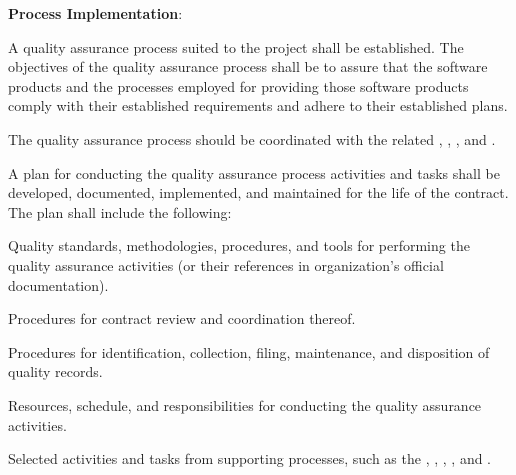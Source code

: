 			\begin{adjustwidth}{2em}{0pt} 

				\begin{compactenum}

					\item {\bf Process Implementation}:

					\begin{compactenum}

						\item A quality assurance process suited to the project shall be established. The objectives of the quality assurance process shall be to assure that the software products and the processes employed for providing those software products comply with their established requirements and adhere to their established plans.

						\item The quality assurance process should be coordinated with the related , , , and .

						\item A plan for conducting the quality assurance process activities and tasks shall be developed, documented, implemented, and maintained for the life of the contract. The plan shall include the following:

						\begin{compactenum}

							\item Quality standards, methodologies, procedures, and tools for performing the quality assurance activities (or their references in organization's official documentation).

							\item Procedures for contract review and coordination thereof.

							\item Procedures for identification, collection, filing, maintenance, and disposition of quality records.

							\item Resources, schedule, and responsibilities for conducting the quality assurance activities.

							\item Selected activities and tasks from supporting processes, such as the , , , , and .


\end{compactenum}
\end{compactenum}
\end{compactenum}
\end{adjustwidth}
